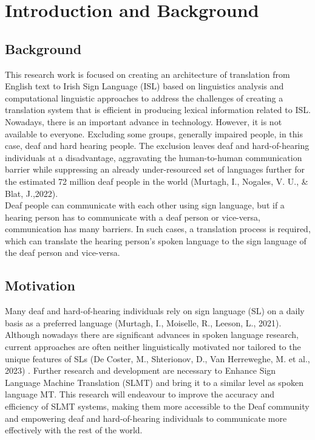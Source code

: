 \chapter{Introduction and Background} \label{sec:introduction}


\section{Background}

This research work is focused on creating an architecture of translation from English text to Irish Sign Language (ISL) based on linguistics analysis and computational linguistic approaches to address the challenges of creating a translation system that is efficient in producing lexical information related to ISL.\\

Nowadays, there is an important advance in technology. However, it is not available to everyone. Excluding some groups, generally impaired people, in this case, deaf and hard hearing people. The exclusion leaves deaf and hard-of-hearing individuals at a disadvantage, aggravating the human-to-human communication barrier while suppressing an already under-resourced set of languages further for the estimated 72 million deaf people in the world (Murtagh, I., Nogales, V. U., \& Blat, J.,2022).\\

Deaf people can communicate with each other using sign language, but if a hearing person has to communicate with a deaf person or vice-versa, communication has many barriers. In such cases, a translation process is required, which can translate the hearing person’s spoken language to the sign language of the deaf person and vice-versa.

\newpage


\section{Motivation}

Many deaf and hard-of-hearing individuals rely on sign
language (SL) on a daily basis as a preferred language (Murtagh, I., Moiselle, R., Leeson, L., 2021).
Although nowadays there are significant advances in spoken
language research, current approaches are often neither
linguistically motivated nor tailored to the unique features of
SLs (De Coster, M., Shterionov, D., Van Herreweghe, M. et al., 2023) . Further research and development are necessary to
Enhance Sign Language Machine Translation (SLMT) and bring
it to a similar level as spoken language MT. This research will
endeavour to improve the accuracy and efficiency of SLMT
systems, making them more accessible to the Deaf community
and empowering deaf and hard-of-hearing individuals to
communicate more effectively with the rest of the world.\\


